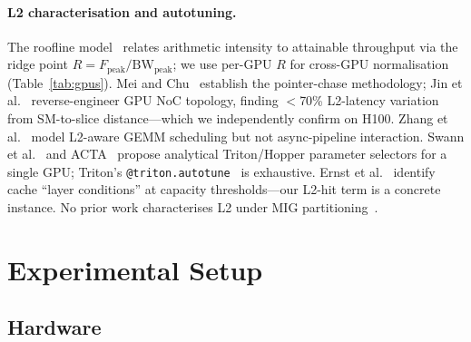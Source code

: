 \documentclass[10pt,twocolumn]{article}
\begin{document}
\paragraph{L2 characterisation and autotuning.}
The roofline model~\cite{roofline} relates arithmetic intensity to
attainable throughput via the ridge point $R = F_{\text{peak}} /
\text{BW}_{\text{peak}}$; we use per-GPU $R$ for cross-GPU
normalisation (Table~\ref{tab:gpus}).  Mei and
Chu~\cite{mei_dissecting} establish the pointer-chase methodology;
Jin et al.~\cite{gpu_noc} reverse-engineer GPU NoC topology,
finding $<$70\% L2-latency variation from SM-to-slice
distance---which we independently confirm on H100.  Zhang et
al.~\cite{hytis} model L2-aware GEMM scheduling but not
async-pipeline interaction.  Swann et al.~\cite{tritonblas} and
ACTA~\cite{acta} propose analytical Triton/Hopper parameter
selectors for a single GPU; Triton's
\texttt{@triton.autotune}~\cite{triton} is exhaustive.  Ernst et
al.~\cite{layer_conditions} identify cache ``layer conditions'' at
capacity thresholds---our L2-hit term is a concrete instance.  No
prior work characterises L2 under MIG partitioning~\cite{mig_guide}.

\section{Experimental Setup}
\label{sec:setup}

\subsection{Hardware}
\end{document}
